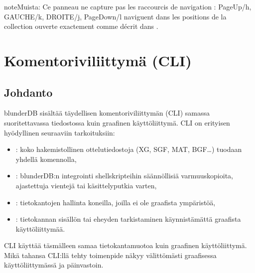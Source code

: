 \documentclass[letterpaper,10pt,finnish]{sphinxmanual}
\begin{document}
\begin{sphinxadmonition}{note}{Muista:}
\sphinxAtStartPar
Ce panneau ne capture pas les raccourcis de navigation :
PageUp/h, GAUCHE/k, DROITE/j, PageDown/l naviguent dans les positions de
la collection ouverte exactement comme décrit dans
{\hyperref[\detokenize{raccourcis:raccourcis-navigation}]{}}.
\end{sphinxadmonition}

\sphinxstepscope


\section{Komentoriviliittymä (CLI)}
\label{\detokenize{cli:interface-en-ligne-de-commande-cli}}\label{\detokenize{cli:cli}}\label{\detokenize{cli::doc}}

\subsection{Johdanto}
\label{\detokenize{cli:introduction}}
\sphinxAtStartPar
blunderDB sisältää täydellisen komentoriviliittymän (CLI) samassa suoritettavassa tiedostossa kuin graafinen käyttöliittymä. CLI on erityisen hyödyllinen seuraaviin tarkoituksiin:
\begin{itemize}
\item {} 
\sphinxAtStartPar
{}: koko hakemistollinen ottelutiedostoja (XG, SGF, MAT, BGF…) tuodaan yhdellä komennolla,

\item {} 
\sphinxAtStartPar
{}: blunderDB:n integrointi shell\sphinxhyphen{}skripteihin säännöllisiä varmuuskopioita, ajastettuja vientejä tai käsittelyputkia varten,

\item {} 
\sphinxAtStartPar
{}: tietokantojen hallinta koneilla, joilla ei ole graafista ympäristöä,

\item {} 
\sphinxAtStartPar
{}: tietokannan sisällön tai eheyden tarkistaminen käynnistämättä graafista käyttöliittymää.

\end{itemize}

\sphinxAtStartPar
CLI käyttää täsmälleen samaa tietokantamuotoa kuin graafinen käyttöliittymä. Mikä tahansa CLI:llä tehty toimenpide näkyy välittömästi graafisessa käyttöliittymässä ja päinvastoin.
\end{document}
